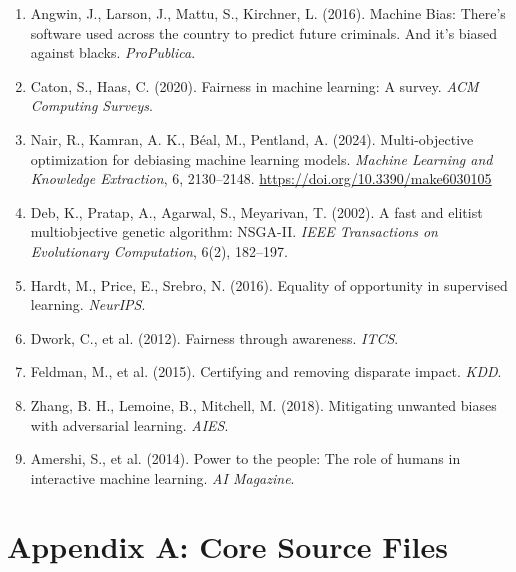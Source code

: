 \documentclass[12pt,a4paper]{article}
\begin{document}
\begin{enumerate}
    \item[{[\small{1}]}] \label{angwin2016machine} Angwin, J., Larson, J., Mattu, S., Kirchner, L. (2016). Machine Bias: There's software used across the country to predict future criminals. And it's biased against blacks. \textit{ProPublica}.
    \item[{[\small{2}]}] \label{caton2020fairness} Caton, S., Haas, C. (2020). Fairness in machine learning: A survey. \textit{ACM Computing Surveys}.
    \item[{[\small{3}]}] \label{rN2024multiobj} Nair, R., Kamran, A. K., Béal, M., Pentland, A. (2024). Multi-objective optimization for debiasing machine learning models. \textit{Machine Learning and Knowledge Extraction}, 6, 2130--2148. \url{https://doi.org/10.3390/make6030105}
    \item[{[\small{4}]}] \label{deb2002nsga2} Deb, K., Pratap, A., Agarwal, S., Meyarivan, T. (2002). A fast and elitist multiobjective genetic algorithm: NSGA-II. \textit{IEEE Transactions on Evolutionary Computation}, 6(2), 182--197.
    \item[{[\small{5}]}] \label{hardt2016equality} Hardt, M., Price, E., Srebro, N. (2016). Equality of opportunity in supervised learning. \textit{NeurIPS}.
    \item[{[\small{6}]}] \label{dwork2012fairness} Dwork, C., et al. (2012). Fairness through awareness. \textit{ITCS}.
    \item[{[\small{7}]}] \label{feldman2015certifying} Feldman, M., et al. (2015). Certifying and removing disparate impact. \textit{KDD}.
    \item[{[\small{8}]}] \label{zhang2018mitigating} Zhang, B. H., Lemoine, B., Mitchell, M. (2018). Mitigating unwanted biases with adversarial learning. \textit{AIES}.
    \item[{[\small{9}]}] \label{amershi2014power} Amershi, S., et al. (2014). Power to the people: The role of humans in interactive machine learning. \textit{AI Magazine}.
\end{enumerate}

\newpage
\appendix
\section{Appendix A: Core Source Files}
\end{document}
